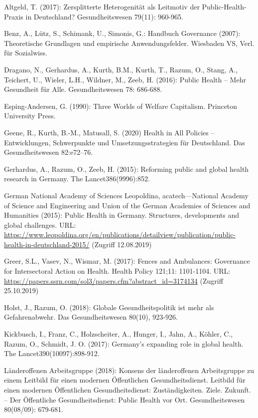 \documentclass{article}
\begin{document}
Altgeld, T. (2017): Zersplitterte Heterogenität als Leitmotiv der Public-Health-Praxis in Deutschland? Gesundheitswesen 79(11): 960-965.


Benz, A., Lütz, S., Schimank, U., Simonis, G.: Handbuch Governance (2007): Theoretische Grundlagen und empirische Anwendungsfelder. Wiesbaden VS, Verl. für Sozialwiss.


Dragano, N., Gerhardus, A., Kurth, B.M., Kurth, T., Razum, O., Stang, A., Teichert, U., Wieler, L.H., Wildner, M., Zeeb, H. (2016): Public Health – Mehr Gesundheit für Alle. Gesundheitswesen 78: 686-688.


Esping-Andersen, G. (1990): Three Worlds of Welfare Capitalism. Princeton University Press.


Geene, R., Kurth, B.-M., Matusall, S. (2020) Health in All Policies – Entwicklungen, Schwerpunkte und Umsetzungsstrategien für Deutschland. Das Gesundheitswesen 82:e72–76.


Gerhardus, A., Razum, O., Zeeb, H. (2015): Reforming public and global health research in Germany. The Lancet386(9996):852.


German National Academy of Sciences Leopoldina, acatech—National Academy of Science and Engineering and Union of the German Academies of Sciences and Humanities (2015): Public Health in Germany. Structures, developments and global challenges. URL: \href{https://www.leopoldina.org/en/publications/detailview/publication/public-health-in-deutschland-2015/}{https://www.leopoldina.org/en/publications/detailview/publication/public-health-in-deutschland-2015/} (Zugriff 12.08.2019)


Greer, S.L., Vasev, N., Wismar, M. (2017): Fences and Ambulances: Governance for Intersectoral Action on Health. Health Policy 121;11: 1101-1104. URL: \href{https://papers.ssrn.com/sol3/papers.cfm?abstract_id=3174134}{https://papers.ssrn.com/sol3/papers.cfm?abstract\_id=3174134} (Zugriff 25.10.2019)


Holst, J., Razum, O. (2018): Globale Gesundheitspolitik ist mehr als Gefahrenabwehr. Das Gesundheitswesen 80(10), 923-926.


Kickbusch, I., Franz, C., Holzscheiter, A., Hunger, I., Jahn, A., Köhler, C., Razum, O., Schmidt, J. O. (2017): Germany's expanding role in global health. The Lancet390(10097):898-912.


Länderoffenen Arbeitsgruppe (2018): Konsens der länderoffenen Arbeitsgruppe zu einem Leitbild für einen modernen Öffentlichen Gesundheitsdienst. Leitbild für einen modernen Öffentlichen Gesundheitsdienst: Zuständigkeiten. Ziele. Zukunft. – Der Öffentliche Gesundheitsdienst: Public Health vor Ort. Gesundheitswesen 80(08/09): 679-681. 
\end{document}
